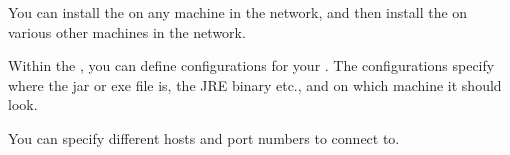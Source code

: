 You can install the \ite{}  on any machine in the network, and then install the \gdagent on various other machines in the network. 

Within the \ite{}, you can define configurations for your \gdaut{}. The configurations specify where the \gdaut{} jar or exe file is, the JRE binary etc., and on which machine it should look.

You can specify different \gdagent{} hosts and port numbers to connect to. 

